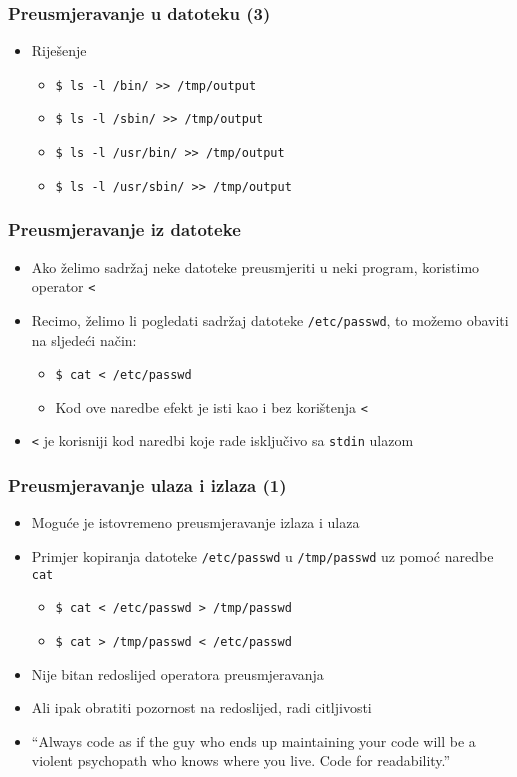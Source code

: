 \documentclass{beamer}
\newcommand{\shell}[1]{\texttt{#1}}
\begin{document}
\begin{frame}[t]
\frametitle{Preusmjeravanje u datoteku (3)}
\begin{itemize}
	\item Riješenje
	\begin{itemize}
	
	\item[] \shell{\$ ls -l /bin/ >> /tmp/output}
	\item[] \shell{\$ ls -l /sbin/ >> /tmp/output}
	\item[] \shell{\$ ls -l /usr/bin/ >> /tmp/output}
	\item[] \shell{\$ ls -l /usr/sbin/ >> /tmp/output}

	\end{itemize}
\end{itemize}
\end{frame}


\begin{frame}[t]
\frametitle{Preusmjeravanje iz datoteke}
\begin{itemize}
  \item Ako želimo sadržaj neke datoteke preusmjeriti u neki program, 
        koristimo operator \shell{<}
  \item Recimo, želimo li pogledati sadržaj datoteke \shell{/etc/passwd},
        to možemo obaviti na sljedeći način:
  \begin{itemize}
    \item[] \shell{\$ cat < /etc/passwd}
    \item[] {\small Kod ove naredbe efekt je isti kao i bez korištenja \shell{<}}
  \end{itemize}
	\item \shell{<} je korisniji kod naredbi koje rade isključivo sa \shell{stdin} ulazom
\end{itemize}
\end{frame}

\begin{frame}[t]
\frametitle{Preusmjeravanje ulaza i izlaza (1)}
\begin{itemize}
  \item Moguće je istovremeno preusmjeravanje izlaza i ulaza
  \item Primjer kopiranja datoteke \shell{/etc/passwd} u 
        \shell{/tmp/passwd} uz pomoć naredbe \shell{cat}
  \begin{itemize}
    \item[] \shell{\$ cat < /etc/passwd > /tmp/passwd}
    \item[] \shell{\$ cat > /tmp/passwd < /etc/passwd}
  \end{itemize}
  \item Nije bitan redoslijed operatora preusmjeravanja
  \item Ali ipak obratiti pozornost na redoslijed, radi citljivosti
  \item ``Always code as if the guy who ends up maintaining your code will be a violent psychopath who knows where you live. Code for readability.''
\end{itemize}
\end{frame}
\end{document}
